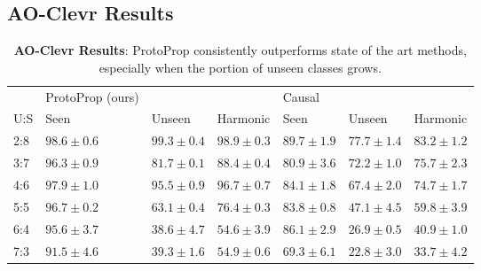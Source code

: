 \documentclass{article}
\begin{document}
\subsection{AO-Clevr Results}
\label{ap:clevr_results}
\begin{table}[htb]
\caption{\textbf{AO-Clevr Results}: ProtoProp consistently outperforms state of the art methods, especially when the portion of unseen classes grows.}
\label{tab:results_clevr}
\begin{tabular}{llll|lll}
\hline
\textbf{}    & ProtoProp (ours)     &                 &                   & Causal \citep{atzmon2020causal}     &                 &                    \\ 
U:S & Seen & Unseen & Harmonic & Seen & Unseen & Harmonic \\ \hline
2:8 & $98.6 \pm 0.6$     & $99.3 \pm 0.4$       & $98.9 \pm 0.3$         & $89.7 \pm 1.9$ & $77.7 \pm 1.4$ & $83.2 \pm 1.2$ \\
3:7 & $96.3 \pm 0.9$     & $81.7 \pm 0.1$       & $88.4 \pm 0.4$         & $80.9 \pm 3.6$ & $72.2 \pm 1.0$ & $75.7 \pm 2.3$ \\
4:6 & $97.9 \pm 1.0$     & $95.5 \pm 0.9$       & $96.7 \pm 0.7$         & $84.1 \pm 1.8$ & $67.4 \pm 2.0$ & $74.7 \pm 1.7$ \\
5:5 & $96.7 \pm 0.2$     & $63.1 \pm 0.4$       & $76.4 \pm 0.3$         & $83.8 \pm 0.8$ & $47.1 \pm 4.5$ & $59.8 \pm 3.9$ \\
6:4 & $95.6 \pm 3.7$     & $38.6 \pm 4.7$       & $54.6 \pm 3.9$         & $86.1 \pm 2.9$ & $26.9 \pm 0.5$ & $40.9 \pm 1.0$ \\
7:3 & $91.5 \pm 4.6$     & $39.3 \pm 1.6$       & $54.9 \pm 0.6$         & $69.3 \pm 6.1$ & $22.8 \pm 3.0$ & $33.7 \pm 4.2$ \\ \hline
\end{tabular}
\vskip 2mm


\end{table}
\end{document}
